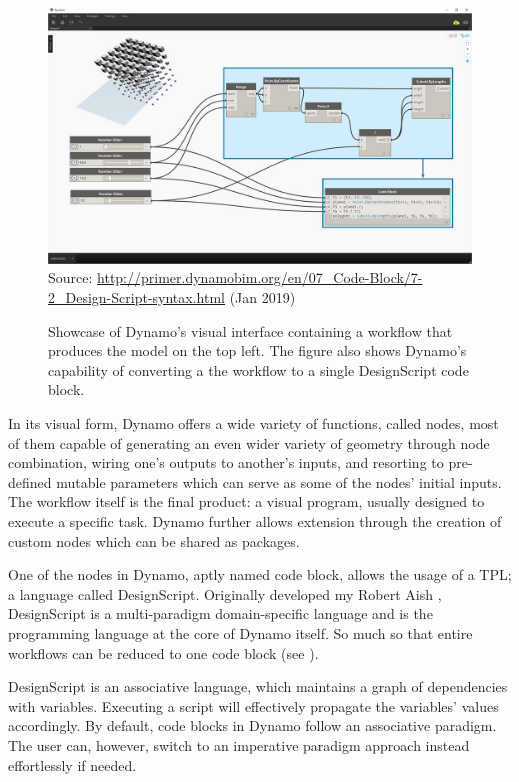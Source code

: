 \begin{figure}[htbp]
  \includegraphics[width=\textwidth]{fig/dynamo-node-to-code}
  {\scriptsize
  Source: \url{http://primer.dynamobim.org/en/07_Code-Block/7-2_Design-Script-syntax.html}
  (Jan 2019)}
  \caption[Dynamo's visual interface with node to code translation]{%
    Showcase of Dynamo's visual interface containing a workflow that produces
    the model on the top left.  The figure also shows Dynamo's capability of
    converting a the workflow to a single DesignScript code block.}
  \label{fig:related.ad.dynamo.node2code}
\end{figure}

In its visual form, Dynamo offers a wide variety of functions, called nodes,
most of them capable of generating an even wider variety of geometry through
node combination, wiring one's outputs to another's inputs, and resorting to
pre-defined mutable parameters which can serve as some of the nodes' initial
inputs.  The workflow itself is the final product: a visual program, usually
designed to execute a specific task.  Dynamo further allows extension through the
creation of custom nodes which can be shared as packages.

One of the nodes in Dynamo, aptly named code block, allows the usage of a
\ac{TPL}; a language called DesignScript.  Originally developed my Robert Aish
\cite{Aish:2011:DesignScript}, DesignScript is a multi-paradigm domain-specific
language and is the programming language at the core of Dynamo itself.  So much
so that entire workflows can be reduced to one code block (see
).

DesignScript is an associative language, which maintains a graph of dependencies
with variables.  Executing a script will effectively propagate the variables'
values accordingly.  By default, code blocks in Dynamo follow an associative
paradigm.  The user can, however, switch to an imperative paradigm approach
instead effortlessly if needed.


